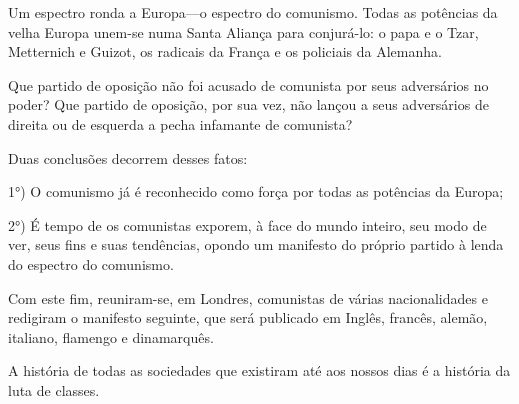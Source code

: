 \alinhaversocentro{}

\alinhanormal


Um espectro ronda a Europa---o espectro do comunismo. Todas as
potências da velha Europa unem-se numa Santa Aliança para conjurá-lo:
o papa e o Tzar, Metternich e Guizot, os radicais da França e os
policiais da Alemanha.


Que partido de oposição não foi acusado de comunista por seus
adversários no poder? Que partido de oposição, por sua vez, não lançou
a seus adversários de direita ou de esquerda a pecha infamante de
comunista?

Duas conclusões decorrem desses fatos:

1°) O comunismo já é reconhecido como força por todas as potências da
Europa;

2°) É tempo de os comunistas exporem, à face do mundo inteiro, seu
modo de ver, seus fins e suas tendências, opondo um manifesto do
próprio partido à lenda do
espectro do comunismo.

Com este fim, reuniram-se, em Londres, comunistas de várias
nacionalidades e redigiram o manifesto seguinte, que será publicado em
Inglês, francês, alemão, italiano, flamengo e dinamarquês.




A história de todas as sociedades que existiram até aos nossos
dias é a história da luta de classes.

